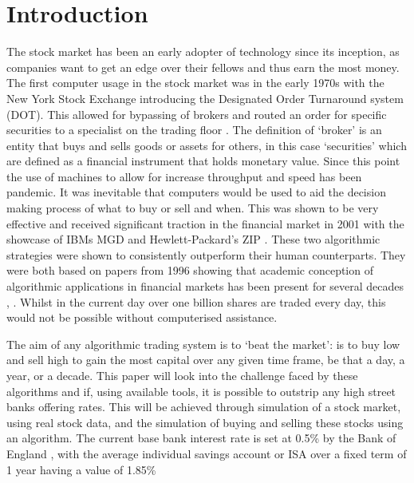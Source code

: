 \documentclass[conference]{IEEEtran}
\begin{document}

\section{Introduction}

The stock market has been an early adopter of technology since its inception, as companies want to get an edge over their fellows and thus earn the most money. The first computer usage in the stock market was in the early 1970s with the New York Stock Exchange introducing  the Designated Order Turnaround system (DOT). This allowed for bypassing of brokers and routed an order for specific securities to a specialist on the trading floor \cite{Hasbrouck}. The definition of `broker' is an entity that buys and sells goods or assets for others, in this case `securities' which are defined as a financial instrument that holds monetary value. Since this point the use of machines to allow for increase throughput and speed has been pandemic. It was inevitable that computers would be used to aid the decision making process of what to buy or sell and when. This was shown to be very effective and received significant traction in the financial market in 2001 with the showcase of IBMs MGD and  Hewlett-Packard's ZIP \cite{Tesauro2001}. These two algorithmic strategies were shown to consistently outperform their human counterparts. They were both based on papers from 1996 showing that academic conception of algorithmic applications in financial markets has been present for several decades \cite{Gjerstad1998}, \cite{Cliff1998}. Whilst in the current day over one billion shares are traded every day, this would not be possible without computerised assistance. 

The aim of any algorithmic trading system is to `beat the market': is to buy low and sell high to gain the most capital over any given time frame, be that a day, a year, or a decade. This paper will look into the challenge faced by these algorithms and if, using available tools, it is possible to outstrip any high street banks offering rates. This will be achieved through simulation of a stock market, using real stock data, and the simulation of buying and selling these stocks using an algorithm. The current base bank interest rate is set at 0.5\% by the Bank of England \cite{BankofEngland2014}, with the average individual savings account or ISA over a fixed term of 1 year having a value of 1.85\% \cite{Murray2018}
\end{document}
